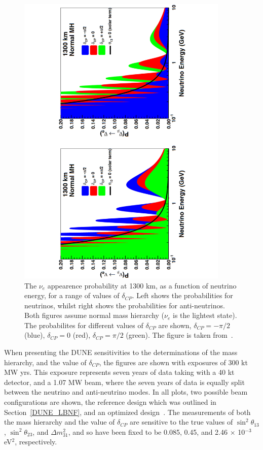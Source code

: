 \begin{figure}[h!]
  \centering
  \includegraphics[width=0.9\textwidth]{DUNEOscillProb}
  \caption[The $\nu_e$ appearence probability at 1300 km, as a function of neutrino energy, for a range of values of $\delta_{CP}$]
          {The $\nu_e$ appearence probability at 1300 km, as a function of neutrino energy, for a range of values of $\delta_{CP}$. Left shows the probabilities for neutrinos, whilst right shows the probabilities for anti-neutrinos. Both figures assume normal mass hierarchy ($\nu_e$ is the lightest state). The probabilites for different values of $\delta_{CP}$ are shown, $\delta_{CP} = -\pi/2$ (blue), $\delta_{CP} = 0$ (red), $\delta_{CP} = \pi/2$ (green). The figure is taken from~\citep{DUNECDR_V2}.}
  \label{fig:DUNEOscillProb}
\end{figure}

When presenting the DUNE sensitivities to the determinations of the mass hierarchy, and the value of $\delta_{CP}$, the figures are shown with exposures of 300 kt MW yrs. This exposure represents seven years of data taking with a 40 kt detector, and a 1.07 MW beam, where the seven years of data is equally split between the neutrino and anti-neutrino modes. In all plots, two possible beam configurations are shown, the reference design which was outlined in Section~\ref{DUNE_LBNF}, and an optimized design~\citep{DUNECDR_V3}. The measurements of both the mass hierarchy and the value of $\delta_{CP}$ are sensitive to the true values of $\sin^2\theta_{13}$, $\sin^2\theta_{23}$, and $\Delta m^{2}_{31}$, and so have been fixed to be 0.085, 0.45, and 2.46 $\times$ 10$^{-3}$ eV$^{2}$, respectively. \\

